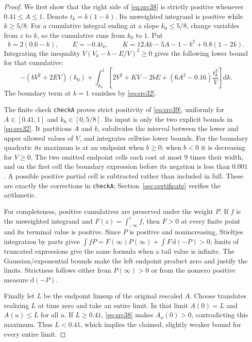 \documentclass[11pt,a4paper]{article}
\numberwithin{equation}{section}
\theoremstyle{definition}
\theoremstyle{remark}
\newcommand{\dd}{\mathrm d}
\begin{document}
\begin{proof}
We first show that the right side of \eqref{eq:src38} is strictly
positive whenever $0.41\le A\le1$.  Denote $t_k=k(1-k)$.  Its
unweighted integrand is positive while $k\ge5/8$.  For a cumulative
integral ending at a slope $k_0\le5/8$, change variables from $z$ to
$k$, so the cumulative runs from $k_0$ to $1$.  Put
\[
 b=2(0.6-k),\qquad E=-0.4t_k,\qquad
 K=12Ak-5A-1-b^2+0.8(1-2k).
\]
Integrating the inequality
$V(V_k-b-E/V)^2\ge0$ gives the following lower bound for that
cumulative:
\begin{equation}
 -(bV^2+2EV)(k_0)
 +\int_{k_0}^1
       \left[2V^2+KV-2bE+(6A^2-0.16)\frac{t_k^2}{V}\right]\dd k.
 \label{eq:src39}
\end{equation}
The boundary term at $k=1$ vanishes by \eqref{eq:src32}.

The finite check \texttt{checkA} proves strict positivity of
\eqref{eq:src39}, uniformly for $A\in[0.41,1]$ and $k_0\in[0,5/8]$.
Its input is only the two explicit bounds in \eqref{eq:src32}.
It partitions $A$ and $k$, subdivides the interval between the lower
and upper allowed values of $V$, and integrates cellwise lower bounds.
For the boundary quadratic its maximum is at an endpoint when
$b\ge0$; when $b<0$ it is decreasing for $V\ge0$.  The two omitted
endpoint cells each cost at most $9$ times their width, and on the
first cell the boundary expression before its negation is less than
$0.001$.  A possible positive partial cell is subtracted rather than
included in full.  These are exactly the corrections in
\texttt{checkA}; Section~\ref{sec:certificate} verifies the arithmetic.

For completeness, positive cumulatives are preserved under the weight
$P$.  If $f$ is the unweighted integrand and
$F(z)=\int_{-\infty}^z f$, then $F>0$ at every finite point and its
terminal value is positive.  Since $P$ is positive and nonincreasing,
Stieltjes integration by parts gives
$\int fP=F(\infty)P(\infty)+\int F\,\dd(-P)>0$; limits of truncated
expressions give the same formula when a tail value is infinite.
The Gaussian/exponential bounds make the left endpoint product zero
and justify the limits.  Strictness follows either from
$P(\infty)>0$ or from the nonzero positive measure $\dd(-P)$.

Finally let $L$ be the endpoint limsup of the original rescaled $A$.
Choose translates realizing $L$ at time zero and take an entire limit.
In that limit $A(0)=L$ and $A(u)\le L$ for all $u$.  If $L\ge0.41$,
\eqref{eq:src38} makes $A_u(0)>0$, contradicting this maximum.
Thus $L<0.41$, which implies the claimed, slightly weaker bound for
every entire limit.
\end{proof}
\end{document}

